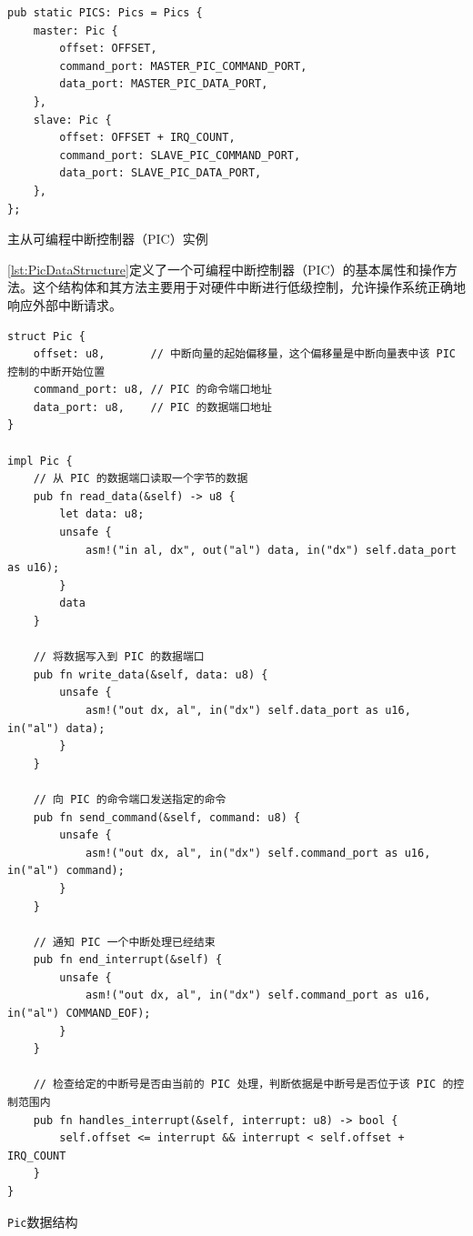 \begin{listing}[htbp]
    \begin{verbatim}
pub static PICS: Pics = Pics {
    master: Pic {
        offset: OFFSET,
        command_port: MASTER_PIC_COMMAND_PORT,
        data_port: MASTER_PIC_DATA_PORT,
    },
    slave: Pic {
        offset: OFFSET + IRQ_COUNT,
        command_port: SLAVE_PIC_COMMAND_PORT,
        data_port: SLAVE_PIC_DATA_PORT,
    },
};
    \end{verbatim}
    \caption{主从可编程中断控制器（PIC）实例}\label{lst:MasterSlavePICInstance}
\end{listing}

\cref{lst:PicDataStructure}定义了一个可编程中断控制器（PIC）的基本属性和操作方法。这个结构体和其方法主要用于对硬件中断进行低级控制，允许操作系统正确地响应外部中断请求。

\begin{listing}[htbp]
    \begin{verbatim}
struct Pic {
    offset: u8,       // 中断向量的起始偏移量，这个偏移量是中断向量表中该 PIC 控制的中断开始位置
    command_port: u8, // PIC 的命令端口地址
    data_port: u8,    // PIC 的数据端口地址
}

impl Pic {
    // 从 PIC 的数据端口读取一个字节的数据
    pub fn read_data(&self) -> u8 {
        let data: u8;
        unsafe {
            asm!("in al, dx", out("al") data, in("dx") self.data_port as u16);
        }
        data
    }

    // 将数据写入到 PIC 的数据端口
    pub fn write_data(&self, data: u8) {
        unsafe {
            asm!("out dx, al", in("dx") self.data_port as u16, in("al") data);
        }
    }

    // 向 PIC 的命令端口发送指定的命令
    pub fn send_command(&self, command: u8) {
        unsafe {
            asm!("out dx, al", in("dx") self.command_port as u16, in("al") command);
        }
    }

    // 通知 PIC 一个中断处理已经结束
    pub fn end_interrupt(&self) {
        unsafe {
            asm!("out dx, al", in("dx") self.command_port as u16, in("al") COMMAND_EOF);
        }
    }

    // 检查给定的中断号是否由当前的 PIC 处理，判断依据是中断号是否位于该 PIC 的控制范围内
    pub fn handles_interrupt(&self, interrupt: u8) -> bool {
        self.offset <= interrupt && interrupt < self.offset + IRQ_COUNT
    }
}
    \end{verbatim}
    \caption{\texttt{Pic}数据结构}\label{lst:PicDataStructure}
\end{listing}

